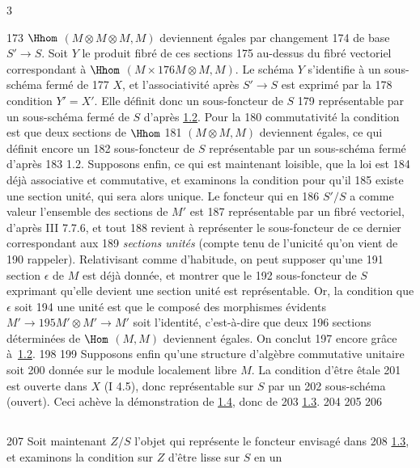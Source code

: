 3	\documentclass[10pt]{../fichiers-configuration-latex/smfart}
\begin{document}
   173	$\Hhom$ $(M\otimes M\otimes M, M)$ deviennent égales par changement
   174	de base $S'\rightarrow S$. Soit $Y$ le produit fibré de ces sections
   175	au-dessus du fibré vectoriel correspondant à $\Hhom$ $(M\times
   176	M\otimes M, M)$. Le schéma $Y$ s'identifie à un sous-schéma fermé de
   177	$X$, et l'associativité après $S'\rightarrow S$ est exprimé par la
   178	condition $Y'=X'$. Elle définit donc un sous-foncteur de $S$
   179	représentable par un sous-schéma fermé de $S$ d'après \hyperref[XIII.lem1.2]{1.2}. Pour la
   180	commutativité la condition est que deux sections de $\Hhom$
   181	$(M\otimes M,M)$ deviennent égales, ce qui définit encore un
   182	sous-foncteur de $S$ représentable par un sous-schéma fermé d'après
   183	1.2. Supposons enfin, ce qui est maintenant loisible, que la loi est
   184	déjà associative et commutative, et examinons la condition pour qu'il
   185	existe une section unité, qui sera alors unique. Le foncteur qui en
   186	$S'/S$ a comme valeur l'ensemble des sections de $M'$ est
   187	représentable par un fibré vectoriel, d'après \EGA III 7.7.6, et tout
   188	revient à représenter le sous-foncteur de ce dernier correspondant aux
   189	\emph{sections unités} (compte tenu de l'unicité qu'on vient de
   190	rappeler). Relativisant comme d'habitude, on peut supposer qu'une
   191	section $\epsilon$ de $M$ est déjà donnée, et montrer que le
   192	sous-foncteur de $S$ exprimant qu'elle devient une	section unité est représentable. Or, la condition que $\epsilon$ soit
   194	une unité est que le composé des morphismes évidents $M'\rightarrow
   195	M'\otimes M'\rightarrow M'$ soit l'identité, c'est-à-dire que deux
   196	sections déterminées de $\Hom$ $(M,M)$ deviennent égales. On conclut
   197	encore grâce à~\hyperref[XIII.lem1.2]{1.2}.
   198	
   199	Supposons enfin qu'une structure d'algèbre commutative unitaire soit
   200	donnée sur le module localement libre $M$. La condition d'être êtale
   201	est ouverte dans $X$ (\SGA I 4.5), donc représentable sur $S$ par un
   202	sous-schéma (ouvert). Ceci achève la démonstration de \hyperref[XIII.lem1.4]{1.4}, donc de
   203	\hyperref[XIII.lem1.3]{1.3}.
   204	
   205	\setcounter{subsection}{4}
   206	\subsection{}
   207	Soit maintenant $Z/S$ l'objet qui représente le foncteur envisagé dans
   208	\hyperref[XIII.lem1.3]{1.3}, et examinons la condition sur $Z$ d'être lisse sur $S$ en un
\end{document}
